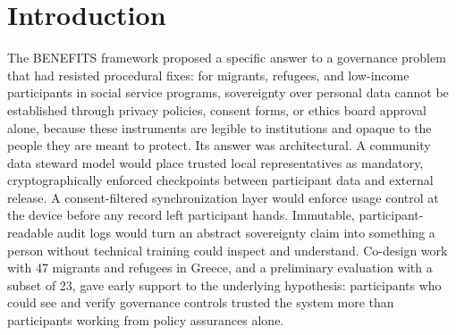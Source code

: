 \section{Introduction}

The BENEFITS framework \cite{katrakazas2026} proposed a specific answer to a governance problem that had resisted procedural fixes: for migrants, refugees, and low-income participants in social service programs, sovereignty over personal data cannot be established through privacy policies, consent forms, or ethics board approval alone, because these instruments are legible to institutions and opaque to the people they are meant to protect. Its answer was architectural. A community data steward model would place trusted local representatives as mandatory, cryptographically enforced checkpoints between participant data and external release. A consent-filtered synchronization layer would enforce usage control at the device before any record left participant hands. Immutable, participant-readable audit logs would turn an abstract sovereignty claim into something a person without technical training could inspect and understand. Co-design work with 47 migrants and refugees in Greece, and a preliminary evaluation with a subset of 23, gave early support to the underlying hypothesis: participants who could see and verify governance controls trusted the system more than participants working from policy assurances alone.

